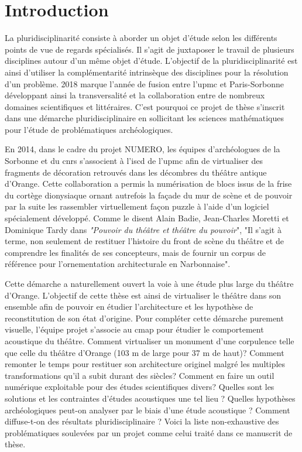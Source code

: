 \chapter*{Introduction}
	
	
			
			La pluridisciplinarité consiste à aborder un objet d'étude selon les différents points de vue de regards spécialisés. Il s'agit de juxtaposer le travail de plusieurs disciplines autour d'un même objet d'étude. L'objectif de la pluridisciplinarité est ainsi d'utiliser la complémentarité intrinsèque des disciplines pour la résolution d'un problème. 
			2018 marque l'année de fusion entre l'\gls{upmc} et Paris-Sorbonne développant ainsi la transversalité et la collaboration entre de nombreux domaines scientifiques et littéraires. C'est pourquoi ce projet de thèse s'inscrit dans une démarche pluridisciplinaire en sollicitant les sciences mathématiques pour l'étude de problématiques archéologiques.
						
						
			En 2014, dans le cadre du projet NUMERO, les équipes d'archéologues de la Sorbonne et du \gls{cnrs} s'associent à l'\gls{iscd} de l'\gls{upmc} afin de virtualiser des fragments de décoration retrouvés dans les décombres du théâtre antique d'Orange. Cette collaboration a permis la numérisation de blocs issus de la frise du cortège dionysiaque ornant autrefois la façade du mur de scène et de pouvoir par la suite les rassembler virtuellement façon puzzle à l'aide d'un logiciel spécialement développé. Comme le disent Alain Badie, Jean-Charles Moretti et Dominique Tardy dans \textit{"Pouvoir du théâtre et théâtre du pouvoir}", "Il s'agit à terme, non seulement de restituer l'histoire du front de scène du théâtre et de comprendre les finalités de ses concepteurs, mais de fournir un corpus de référence pour l'ornementation architecturale en Narbonnaise".
			
			Cette démarche a naturellement ouvert la voie à une étude plus large du théâtre d'Orange. L'objectif de cette thèse est ainsi de virtualiser le théâtre dans son ensemble afin de pouvoir en étudier l'architecture et les hypothèse de reconstitution de son état d'origine. Pour compléter cette démarche purement visuelle, l'équipe projet s'associe au \gls{cmap} pour étudier le comportement acoustique du théâtre. Comment virtualiser un monument d'une corpulence telle que celle du théâtre d'Orange (103 m de large pour 37 m de haut)? Comment remonter le temps pour restituer son architecture originel malgré les multiples transformations qu'il a subit durant des siècles? Comment en faire un outil numérique exploitable pour des études scientifiques divers? Quelles sont les solutions et les contraintes d'études acoustiques une tel lieu ? Quelles hypothèses archéologiques peut-on analyser par le biais d'une étude acoustique ? Comment diffuse-t-on des résultats pluridisciplinaire ? Voici la liste non-exhaustive des problématiques soulevées par un projet comme celui traité dans ce manuscrit de thèse.